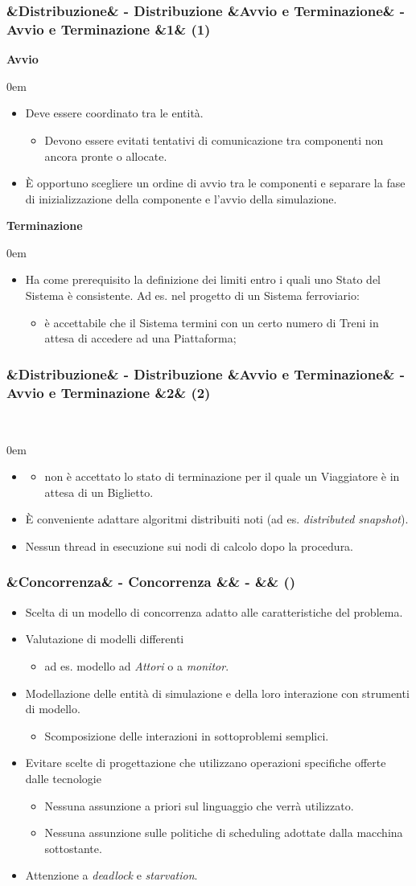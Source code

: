 \documentclass[slidestop,compress,blackandwhite]{beamer}
\newcommand{\ii}[1]{\textit{#1}}
\newcommand{\cm}[1]{\vspace{#1cm}}
\newcommand{\describe}[2]{
	\textbf{#1}\\
	\begin{addmargin}[2em]{0em}
		#2
	\end{addmargin}
}
\newcommand{\newtitle}[4]{
	#1 
	\ifx&#2&%
	\else
  		\large- #2
	\fi
	\ifx&#3&%
	\else
  		\normalsize- #3
	\fi
	\ifx&#4&%
	\else
  		\normalsize (#4)
	\fi
}
\newcommand{\newframe}[5]{
	\begin{frame}
		\frametitle{\newtitle{#1}{#2}{#3}{#4}}
		#5
	\end{frame}
}
\newcommand{\myitemize}[1]{
	\begin{itemize}\itemsep4pt
	#1
	\end{itemize}
}
\begin{document}
	\newframe{}{Distribuzione}{Avvio e Terminazione}{1}{
		\justifying
		\describe{Avvio}{
			\myitemize{
				\item Deve essere coordinato tra le entità.
					\myitemize {
						\item Devono essere evitati tentativi di comunicazione tra componenti non ancora pronte o allocate.
					}
				\item \`E opportuno scegliere un ordine di avvio tra le componenti e separare la fase di inizializzazione della componente e l'avvio della simulazione.
			}
		}
		\cm{0.1}
		\describe{Terminazione}{
			\myitemize{
				\item Ha come prerequisito la definizione dei limiti entro i quali uno Stato del Sistema è consistente. Ad es. nel progetto di un Sistema ferroviario:
					\myitemize {
						\item è accettabile che il Sistema termini con un certo numero di Treni in attesa di accedere ad una Piattaforma;
					} 
			}
		}
	}
	
	\newframe{}{Distribuzione}{Avvio e Terminazione}{2}{
		\describe{}{
			\myitemize {
				\item[]
					\myitemize {
						\item non è accettato lo stato di terminazione per il quale un Viaggiatore è in attesa di un Biglietto.
					}
				\item \`E conveniente adattare algoritmi distribuiti noti (ad es. \ii{distributed snapshot}).
				\item Nessun thread in esecuzione sui nodi di calcolo dopo la procedura.
			}
		}
	}
	
	
	\newframe{}{Concorrenza}{}{}{
		\justifying
		\myitemize {
			\item Scelta di un modello di concorrenza adatto alle caratteristiche del problema.
			\item Valutazione di modelli differenti
				\myitemize{
					\item ad es. modello ad \ii{Attori} o a \ii{monitor}.
				}
			\item Modellazione delle entità di simulazione e della loro interazione con strumenti di modello.
				\myitemize {
					\item Scomposizione delle interazioni in sottoproblemi semplici.
				}
			\item Evitare scelte di progettazione che utilizzano operazioni specifiche offerte dalle tecnologie
				\myitemize {
					\item Nessuna assunzione a priori sul linguaggio che verrà utilizzato.
					\item Nessuna assunzione sulle politiche di scheduling adottate dalla macchina sottostante.
				}
			\item Attenzione a \ii{deadlock} e \ii{starvation}.
				
		}
		
	}
	
\end{document}
